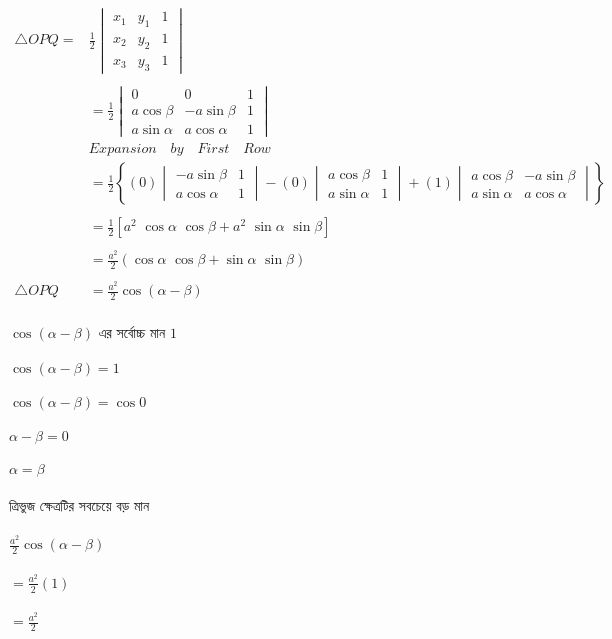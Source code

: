 \documentclass{article}
\begin{document}
   \begin{align*}
   	\triangle OPQ=	&\frac{1}{2}\begin{vmatrix}
   		x_1 &	y_1 & 1\\
   		x_2 & y_2 & 1\\
   		x_3 & y_3 & 1
   	\end{vmatrix}\\
   	\\
   	&=\frac{1}{2}\begin{vmatrix}
   		0 & 0 & 1\\
   	a\cos \beta & -a\sin \beta& 1\\
   	a\sin \alpha & a\cos \alpha & 1
   	\end{vmatrix}\\
   	&\boxed{Expansion \quad by \quad  First \quad  Row}\\ 
   	&=\frac{1}{2}\left\{(0)\begin{vmatrix}
   	  -a\sin \beta& 1\\
   	a\cos \alpha & 1
   	\end{vmatrix}-(0)\begin{vmatrix}
   	 	a\cos \beta& 1\\
   	a\sin \alpha & 1 
   	\end{vmatrix}+(1)\begin{vmatrix}
   	 	a\cos \beta & -a\sin \beta\\
   	a\sin \alpha & a\cos \alpha 
   	\end{vmatrix}\right\}\\
   	\\
   	&=\frac{1}{2}\left[a^2\,\,\cos \alpha \,\,\cos \beta + a^2\,\,\sin \alpha\,\,\sin \beta \right]\\
   	\\
   	&=\frac{a^2}{2}(\cos \alpha \,\,\cos \beta + \sin \alpha\,\,\sin \beta)\\
   	\\
   	\triangle OPQ	&=\frac{a^2}{2} \cos (\alpha-\beta)
   \end{align*}
\\
$\cos (\alpha-\beta)$ এর সর্বোচ্চ মান $1$\\
\\
$\cos (\alpha-\beta)=1$\\
\\
$\cos (\alpha-\beta)=\cos 0$  \\
\\
$\alpha-\beta= 0$  \\
\\
$\alpha=\beta$  \\
\\
ত্রিভুজ ক্ষেত্রটির সবচেয়ে বড় মান \\ 
\\
 $\frac{a^2}{2} \cos (\alpha-\beta)$\\
 \\
 $=\frac{a^2}{2} (1)$\\
 \\ 
   $=\frac{a^2}{2}$\\
\end{document}
